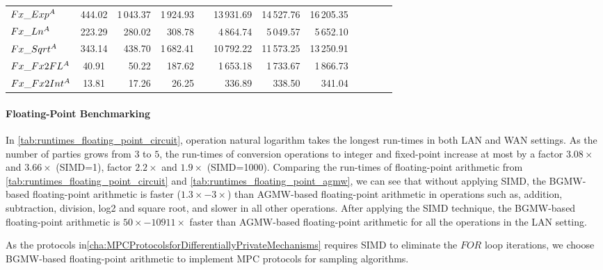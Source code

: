 \begin{table}
{\begin{tabular}{ l c r r r r r r r r r r}
            $Fx\_Exp^{A}$                         & 444.02                  & 1\,043.37 & 1\,924.93               &   & 13\,931.69 & 14\,527.76 & 16\,205.35 \\
            $Fx\_Ln^{A}$                          & 223.29                  & 280.02    & 308.78                  &   & 4\,864.74  & 5\,049.57  & 5\,652.10  \\
            $Fx\_Sqrt^{A}$                        & 343.14                  & 438.70    & 1\,682.41               &   & 10\,792.22 & 11\,573.25 & 13\,250.91 \\
            $Fx\_Fx2FL^{A}$                       & 40.91                   & 50.22     & 187.62                  &   & 1\,653.18  & 1\,733.67  & 1\,866.73  \\
            $Fx\_Fx2Int^{A}$                      & 13.81                   & 17.26     & 26.25                   &   & 336.89     & 338.50     & 341.04     \\
            \bottomrule
        \end{tabular}
    }
\end{table}
\FloatBarrier

\paragraph{Floating-Point Benchmarking}
\label{para:Floating-PointBenchmarking}


In \autoref{tab:runtimes_floating_point_circuit}, operation natural logarithm takes the longest run-times in both LAN and WAN settings. As the number of parties grows from $3$ to $5$, the run-times of conversion operations to integer and fixed-point increase at most by a factor $3.08\times$ and $3.66\times$ (SIMD=1), factor $2.2\times$ and $1.9\times$ (SIMD=1000).
Comparing the run-times of floating-point arithmetic from \autoref{tab:runtimes_floating_point_circuit} and \autoref{tab:runtimes_floating_point_agmw}, we can see that without applying SIMD, the BGMW-based floating-point arithmetic is faster ($1.3\times-3\times$) than AGMW-based floating-point arithmetic in operations such as, addition, subtraction, division, log2 and square root, and slower in all other operations. After applying the SIMD technique, the BGMW-based floating-point arithmetic is $50\times-10911\times$ faster than AGMW-based floating-point arithmetic for all the operations in the LAN setting.

As the protocols in\autoref{cha:MPCProtocolsforDifferentiallyPrivateMechanisms} requires SIMD to eliminate the $FOR$ loop iterations, we choose BGMW-based floating-point arithmetic to implement MPC protocols for sampling algorithms.

